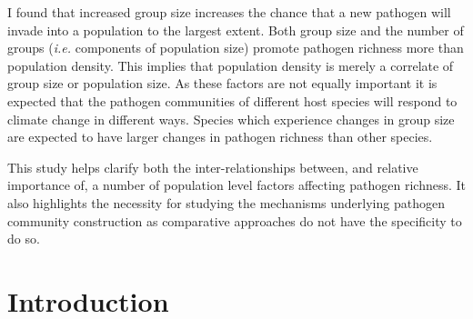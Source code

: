 


I found that increased group size increases the chance that a new pathogen will invade into a population to the largest extent.
Both group size and the number of groups (\emph{i.e.} components of population size) promote pathogen richness more than population density.
This implies that population density is merely a correlate of group size or population size.
As these factors are not equally important it is expected that the pathogen communities of different host species will respond to climate change in different ways.
Species which experience changes in group size are expected to have larger changes in pathogen richness than other species.



This study helps clarify both the inter-relationships between, and relative importance of, a number of population level factors affecting pathogen richness. 
It also highlights the necessity for studying the mechanisms underlying pathogen community construction as comparative approaches do not have the specificity to do so.





\section{Introduction}






